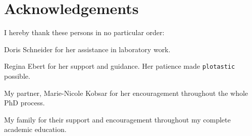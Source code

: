 \section*{Acknowledgements} %

\noindent I hereby thank these persons in no particular order:

\noindent Doris Schneider for her assistance in laboratory work.

\noindent Regina Ebert for her support and guidance.
Her patience made \texttt{plotastic} possible. 

\noindent My partner, Marie-Nicole Kobsar for her encouragement throughout the whole PhD process.

\noindent My family for their support and encouragement throughout my complete academic education. 

